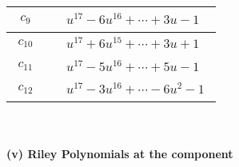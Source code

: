 \documentclass[1p]{elsarticle_modified}
\theoremstyle{definition}
\begin{document}
\begin{tabular}{m{50pt}|m{274pt}}
\hline $$\begin{aligned}c_{9}\end{aligned}$$&$\begin{aligned}
&u^{17}-6 u^{16}+\cdots+3 u-1
\end{aligned}$\\
\hline $$\begin{aligned}c_{10}\end{aligned}$$&$\begin{aligned}
&u^{17}+6 u^{15}+\cdots+3 u+1
\end{aligned}$\\
\hline $$\begin{aligned}c_{11}\end{aligned}$$&$\begin{aligned}
&u^{17}-5 u^{16}+\cdots+5 u-1
\end{aligned}$\\
\hline $$\begin{aligned}c_{12}\end{aligned}$$&$\begin{aligned}
&u^{17}-3 u^{16}+\cdots-6 u^2-1
\end{aligned}$\\
\hline
\end{tabular}\\~\\
\newpage\renewcommand{\arraystretch}{1}
\flushleft \textbf{(v) Riley Polynomials at the component}\newline \\
\end{document}
